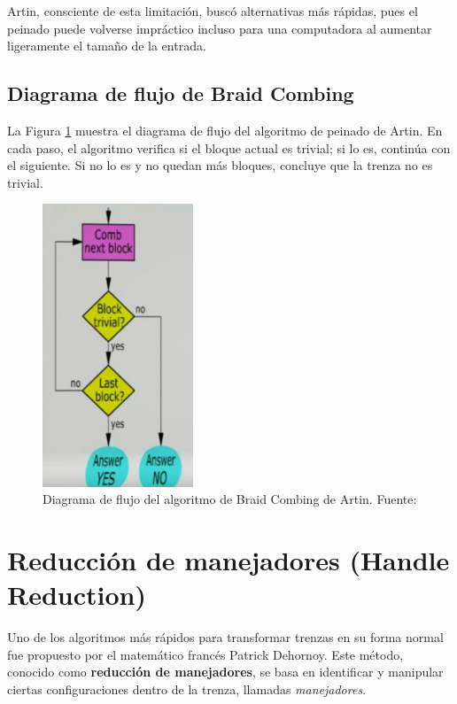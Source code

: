 Artin, consciente de esta limitación, buscó alternativas más rápidas, pues el peinado puede volverse impráctico incluso para una computadora al aumentar ligeramente el tamaño de la entrada.

\subsection{Diagrama de flujo de Braid Combing}

La Figura \ref{fig:diagrama_peinado} muestra el diagrama de flujo del algoritmo de peinado de Artin. En cada paso, el algoritmo verifica si el bloque actual es trivial; si lo es, continúa con el siguiente. Si no lo es y no quedan más bloques, concluye que la trenza no es trivial.

\begin{figure}[h!]
    \centering
    \includegraphics[width=0.4\textwidth]{figures/chapters/3_algoritmos/combing_algorithm.png}
    \caption{Diagrama de flujo del algoritmo de Braid Combing de Artin. Fuente: \cite{esterdalvitBraidsChapter22013}}
    \label{fig:diagrama_peinado}
\end{figure}

\newpage

\section{Reducción de manejadores (Handle Reduction)}

Uno de los algoritmos más rápidos para transformar trenzas en su forma normal fue propuesto por el matemático francés Patrick Dehornoy. Este método, conocido como \textbf{reducción de manejadores}, se basa en identificar y manipular ciertas configuraciones dentro de la trenza, llamadas \textit{manejadores}.

